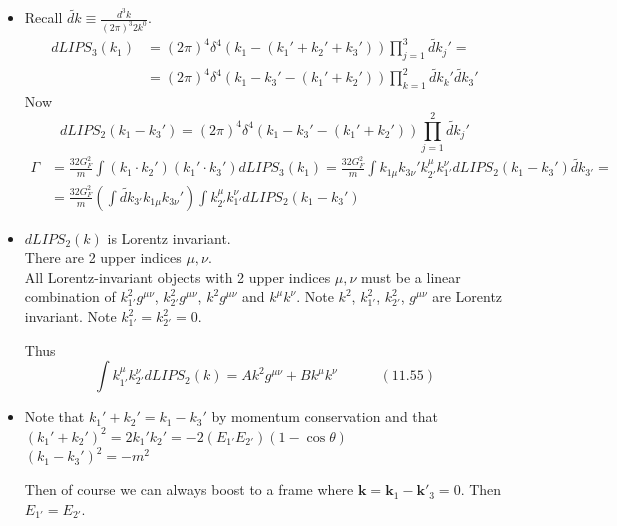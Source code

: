 \documentclass[twoside]{amsart}
\newcommand{\solutionhead}[1]
  {\smallskip
   \noindent{\large\bf Solution #1.}
   }
\begin{document}
\solutionhead{11.3} 
\begin{itemize}
\item[(a)] Recall $\widetilde{dk} \equiv \frac{d^3 k}{ (2\pi)^3 2k^0}$.  
\[
\begin{aligned}
  dLIPS_3(k_1) & = (2\pi)^4 \delta^4(k_1 - (k_1' + k_2' + k_3' ) ) \prod_{j=1}^3 \widetilde{dk}_j' = \\
   & = (2\pi)^4 \delta^4(k_1 - k_3' - (k_1' + k_2'))\prod_{k=1}^2 \widetilde{dk}_k' \widetilde{dk}_3'
\end{aligned}
\]
Now
\[
dLIPS_2(k_1-k_3') = (2\pi)^4 \delta^4(k_1 -k_3' - (k_1' + k_2') ) \prod_{j=1}^2 \widetilde{dk}_j'
\]
\[
\begin{aligned}
  \Gamma & = \frac{32 G_F^2}{m} \int (k_1 \cdot k_2')(k_1' \cdot k_3') dLIPS_3(k_1) = \frac{32 G_F^2}{m} \int k_{1\mu} k_{3\nu}' k_{2'}^{\mu} k_{1'}^{\nu} dLIPS_2(k_1 -k_3')\widetilde{dk}_{3'} = \\
  & = \frac{32 G_F^2}{m} \left( \int \widetilde{dk}_{3'} k_{1\mu} k_{3\nu}' \right) \int k_{2'}^{\mu} k_{1'}^{\nu} dLIPS_2(k_1 - k_3')
\end{aligned}
\]
\item[(b)] $dLIPS_2(k)$ is Lorentz invariant.  \\
There are 2 upper indices $\mu,\nu$.  \\
All Lorentz-invariant objects with 2 upper indices $\mu,\nu$ must be a linear combination of $k_{1'}^2 g^{\mu \nu}$, $k_{2'}^2 g^{\mu \nu}$, $k^2 g^{\mu \nu}$ and $k^{\mu}k^{\nu}$.  Note $k^2$, $k_{1'}^2$, $k_{2'}^2$, $g^{\mu \nu}$ are Lorentz invariant.  Note $k_{1'}^2 = k_{2'}^2 =0$.  

Thus
\[
\int k_{1'}^{\mu} k_{2'}^{\nu} dLIPS_2(k) = Ak^2 g^{\mu \nu} + Bk^{\mu} k^{\nu} \quad \quad \quad (11.55)
\]
\item[(c)] Note that $k_1' +k_2' = k_1 - k_3'$ by momentum conservation and that  \\
$(k_1' + k_2')^2 = 2k_1'k_2' = -2(E_{1'} E_{2'})(1- \cos{\theta})$ \\ 
$(k_1 - k_3')^2 = -m^2$

Then of course we can always boost to a frame where $\mathbf{k} = \mathbf{k}_1 - \mathbf{k}'_3 = 0$.  Then $E_{1'} = E_{2'}$.  



\end{itemize}
\end{document}
